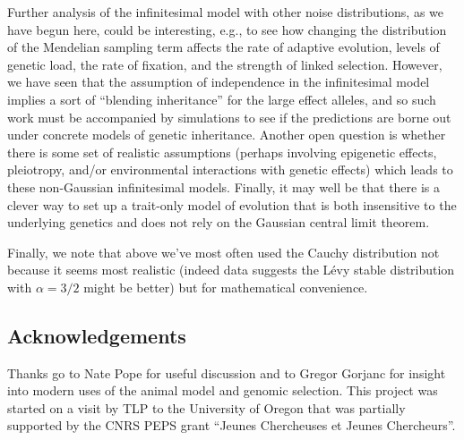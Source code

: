 \documentclass{article}
\newcommand{\1}{\mathbbm{1}}
\theoremstyle{remark}
\theoremstyle{definition}
\begin{document}
Further analysis of the infinitesimal model with other noise distributions,
as we have begun here,
could be interesting,
e.g., to see how changing the distribution of the Mendelian sampling term
affects the rate of adaptive evolution,
levels of genetic load,
the rate of fixation,
and the strength of linked selection.
However,
we have seen that the assumption of independence in the infinitesimal model
implies a sort of ``blending inheritance''
for the large effect alleles,
and so such work must be accompanied by simulations
to see if the predictions are borne out under concrete models of genetic inheritance.
Another open question is whether there is some set of realistic assumptions
(perhaps involving epigenetic effects, pleiotropy, and/or environmental interactions with genetic effects)
which leads to these non-Gaussian infinitesimal models.
Finally, it may well be that there is a clever way to set up a trait-only model of evolution
that is both insensitive to the underlying genetics
and does not rely on the Gaussian central limit theorem.

Finally, we note that above we've most often used the Cauchy distribution
not because it seems most realistic
(indeed data suggests the L\'evy stable distribution with $\alpha=3/2$ might be better)
but for mathematical convenience.


\subsection*{Acknowledgements}
Thanks go to Nate Pope for useful discussion
and to Gregor Gorjanc for insight into modern uses
of the animal model and genomic selection. 
This project was started on a visit by TLP to the University of Oregon that was partially supported by the CNRS PEPS grant ``Jeunes Chercheuses et Jeunes Chercheurs''.




\appendix
\setcounter{table}{0}
\renewcommand{\thetable}{S\arabic{table}}
\setcounter{figure}{0}
\renewcommand{\thefigure}{S\arabic{figure}}
\end{document}
